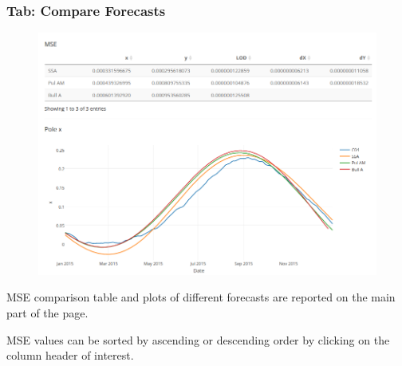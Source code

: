 \documentclass[pdf, unicode, notheorems, xcolor={table}]{beamer}
\begin{document}
\begin{frame}\frametitle{Tab: Compare Forecasts}
	\begin{figure}
		\includegraphics[width=0.7 \linewidth]{compare_result}
	\end{figure}
	MSE comparison table and plots of different forecasts are reported on the main part of the page.
	
	MSE values can be sorted by ascending or descending order by clicking on the column header of interest.
\end{frame}
\end{document}
